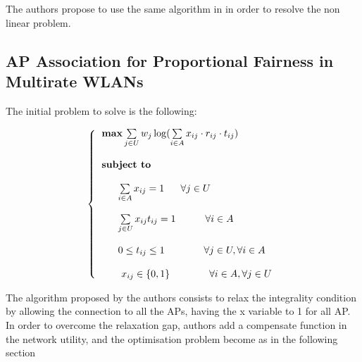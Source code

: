 \documentclass[journal,transmag]{IEEEtran}
\begin{document}
The authors propose to use the same algorithm in \cite{08proportional_fairness_multiRate_LAN} in order to resolve the non linear problem. 

\subsection{AP Association for Proportional Fairness in Multirate WLANs \cite{14AP_association_multirate_WLAN}}
The initial problem to solve is the following:
\begin{footnotesize}
\begin{equation}
\left\{
\begin{tabular}{l} 
$\textbf{max}  \sum\limits_{j \in U}  w_j \log (\sum\limits_{i \in A} x_{ij} \cdot r_{ij} \cdot t_{ij}) $ \\         
\\
\textbf{subject to} \\

\\
~~~~~$ \sum\limits_{i \in A} x_{ij} = 1 $ ~~~ $\forall j \in U $  \\

\\
~~~~~$ \sum\limits_{j \in U} x_{ij} t_{ij} = 1 ~~~~~~~~~ \forall i \in A $ \\ 

\\
~~~~~$ 0\leq t_{ij} \leq 1   ~~~~~~~~~~~~ \forall j \in U, \forall i \in A  $ \\

\\
~~~~~ $x_{ij} \in \{0,1\} ~~~~~~~~~~~~ \forall i \in A, \forall j \in U $ \\

\end{tabular}
\right.
\end{equation}
\end{footnotesize}  

The algorithm proposed by the authors consists to relax the integrality condition by allowing the connection to all the APs, having the x variable to 1 for all AP. In order to overcome the relaxation gap, authors add a compensate function in the network utility, and the optimisation problem become as in the following section 
 
\end{document}
